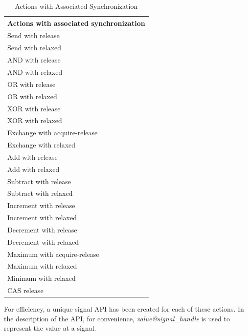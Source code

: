\documentclass{book}
\begin{document}
\begin{table}[!htbp]
  \begin{center}
    \begin{tabular}{p{4in}}
      \hline
      \textbf{Actions with associated synchronization} \\
      \hline
      Send with release \\
      \hline
      Send with relaxed \\
      \hline
      AND with release \\
      \hline
      AND with relaxed \\
      \hline
      OR with release \\
      \hline
      OR with relaxed \\
      \hline
      XOR with release \\
      \hline
      XOR with relaxed \\
      \hline
      Exchange with acquire-release \\
      \hline
      Exchange with relaxed \\
      \hline
      Add with release \\
      \hline
      Add with relaxed \\
      \hline
      Subtract with release \\
      \hline
      Subtract with relaxed \\
      \hline
      Increment with release \\
      \hline
      Increment with relaxed \\
      \hline
      Decrement with release \\
      \hline
      Decrement with relaxed \\
      \hline
      Maximum with acquire-release \\
      \hline
      Maximum with relaxed \\
      \hline
      Minimum with relaxed \\
      \hline
      CAS release \\
      \hline
    \end{tabular}
  \end{center}
  \caption{Actions with Associated Synchronization}
  \label{actionswsync}
\end{table}

For efficiency, a unique signal API has been created for each of
these actions. In the description of the API, for convenience,
\emph{value@signal\_handle} is used to represent the value at a
signal.
\end{document}
